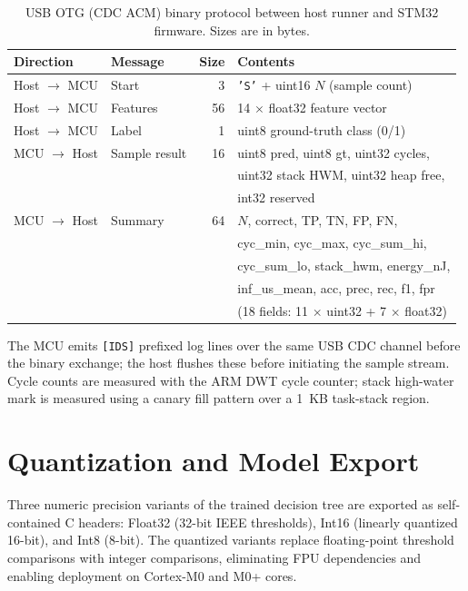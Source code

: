 \begin{table}[t]
\caption{USB OTG (CDC ACM) binary protocol between host runner and STM32 firmware. Sizes are in bytes.}
\label{tab:protocol}
\small
\begin{tabular}{@{}llrl@{}}
\toprule
\textbf{Direction} & \textbf{Message} & \textbf{Size} & \textbf{Contents} \\
\midrule
Host $\to$ MCU & Start      & 3  & \texttt{'S'} + uint16 $N$ (sample count) \\
Host $\to$ MCU & Features   & 56 & 14 $\times$ float32 feature vector \\
Host $\to$ MCU & Label      & 1  & uint8 ground-truth class (0/1) \\
MCU $\to$ Host & Sample result & 16 & uint8 pred, uint8 gt, uint32 cycles, \\
               &            &    & uint32 stack HWM, uint32 heap free, \\
               &            &    & int32 reserved \\
MCU $\to$ Host & Summary    & 64 & $N$, correct, TP, TN, FP, FN, \\
               &            &    & cyc\_min, cyc\_max, cyc\_sum\_hi, \\
               &            &    & cyc\_sum\_lo, stack\_hwm, energy\_nJ, \\
               &            &    & inf\_us\_mean, acc, prec, rec, f1, fpr \\
               &            &    & (18 fields: 11 $\times$ uint32 + 7 $\times$ float32) \\
\bottomrule
\end{tabular}
\end{table}

The MCU emits \texttt{[IDS]} prefixed log lines over the same USB CDC channel before the binary exchange; the host flushes these before initiating the sample stream. Cycle counts are measured with the ARM DWT cycle counter; stack high-water mark is measured using a canary fill pattern over a 1~KB task-stack region.

\section{Quantization and Model Export}
\label{app:quantization}

Three numeric precision variants of the trained decision tree are exported as self-contained C headers: Float32 (32-bit IEEE thresholds), Int16 (linearly quantized 16-bit), and Int8 (8-bit). The quantized variants replace floating-point threshold comparisons with integer comparisons, eliminating FPU dependencies and enabling deployment on Cortex-M0 and M0+ cores.

